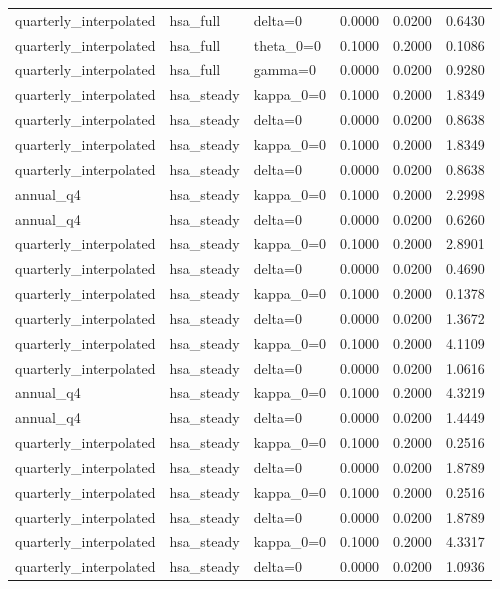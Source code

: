\begin{tabular}{lllrrr}
quarterly\_interpolated & hsa\_full & delta=0 & 0.0000 & 0.0200 & 0.6430 \\
quarterly\_interpolated & hsa\_full & theta\_0=0 & 0.1000 & 0.2000 & 0.1086 \\
quarterly\_interpolated & hsa\_full & gamma=0 & 0.0000 & 0.0200 & 0.9280 \\
quarterly\_interpolated & hsa\_steady & kappa\_0=0 & 0.1000 & 0.2000 & 1.8349 \\
quarterly\_interpolated & hsa\_steady & delta=0 & 0.0000 & 0.0200 & 0.8638 \\
quarterly\_interpolated & hsa\_steady & kappa\_0=0 & 0.1000 & 0.2000 & 1.8349 \\
quarterly\_interpolated & hsa\_steady & delta=0 & 0.0000 & 0.0200 & 0.8638 \\
annual\_q4 & hsa\_steady & kappa\_0=0 & 0.1000 & 0.2000 & 2.2998 \\
annual\_q4 & hsa\_steady & delta=0 & 0.0000 & 0.0200 & 0.6260 \\
quarterly\_interpolated & hsa\_steady & kappa\_0=0 & 0.1000 & 0.2000 & 2.8901 \\
quarterly\_interpolated & hsa\_steady & delta=0 & 0.0000 & 0.0200 & 0.4690 \\
quarterly\_interpolated & hsa\_steady & kappa\_0=0 & 0.1000 & 0.2000 & 0.1378 \\
quarterly\_interpolated & hsa\_steady & delta=0 & 0.0000 & 0.0200 & 1.3672 \\
quarterly\_interpolated & hsa\_steady & kappa\_0=0 & 0.1000 & 0.2000 & 4.1109 \\
quarterly\_interpolated & hsa\_steady & delta=0 & 0.0000 & 0.0200 & 1.0616 \\
annual\_q4 & hsa\_steady & kappa\_0=0 & 0.1000 & 0.2000 & 4.3219 \\
annual\_q4 & hsa\_steady & delta=0 & 0.0000 & 0.0200 & 1.4449 \\
quarterly\_interpolated & hsa\_steady & kappa\_0=0 & 0.1000 & 0.2000 & 0.2516 \\
quarterly\_interpolated & hsa\_steady & delta=0 & 0.0000 & 0.0200 & 1.8789 \\
quarterly\_interpolated & hsa\_steady & kappa\_0=0 & 0.1000 & 0.2000 & 0.2516 \\
quarterly\_interpolated & hsa\_steady & delta=0 & 0.0000 & 0.0200 & 1.8789 \\
quarterly\_interpolated & hsa\_steady & kappa\_0=0 & 0.1000 & 0.2000 & 4.3317 \\
quarterly\_interpolated & hsa\_steady & delta=0 & 0.0000 & 0.0200 & 1.0936 \\

\end{tabular}
